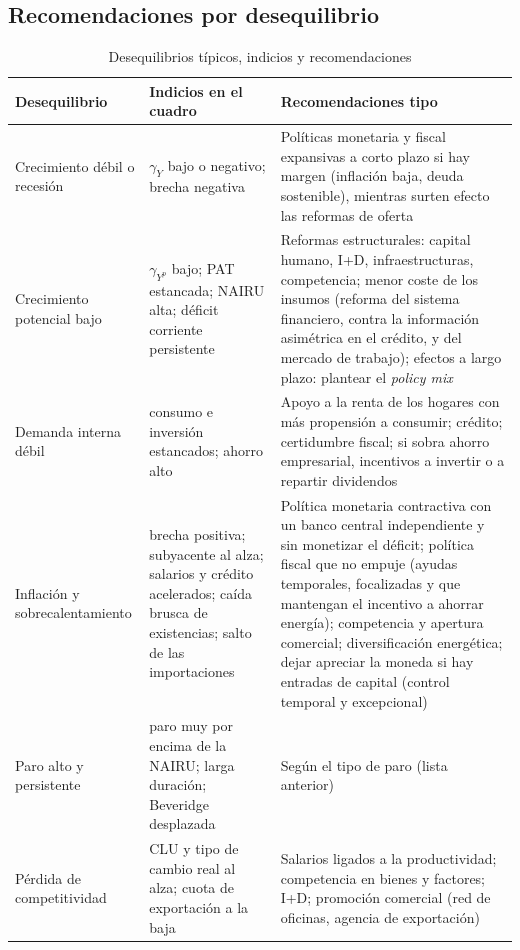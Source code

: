 \documentclass[11pt]{article}
\begin{document}
\subsection{Recomendaciones por desequilibrio}\label{sec:por-desequilibrio}

\begin{table}[!t]
\centering\footnotesize\renewcommand{\arraystretch}{0.9}
\caption{Desequilibrios típicos, indicios y recomendaciones}\label{tab:recomendaciones}
\begin{tabular}{>{\raggedright\arraybackslash}p{2.7cm}>{\raggedright\arraybackslash}p{3.8cm}>{\raggedright\arraybackslash}p{7.8cm}}
\toprule
\rowcolor{tceeazulpalido}
\textbf{Desequilibrio} & \textbf{Indicios en el cuadro} & \textbf{Recomendaciones tipo} \\
\midrule
Crecimiento débil o recesión & $\gamma_Y$ bajo o negativo; brecha negativa & Políticas monetaria y fiscal expansivas a corto plazo si hay margen (inflación baja, deuda sostenible), mientras surten efecto las reformas de oferta \\
Crecimiento potencial bajo & $\gamma_{Y^p}$ bajo; PAT estancada; NAIRU alta; déficit corriente persistente & Reformas estructurales: capital humano, I+D, infraestructuras, competencia; menor coste de los insumos (reforma del sistema financiero, contra la información asimétrica en el crédito, y del mercado de trabajo); efectos a largo plazo: plantear el \emph{policy mix} \\
Demanda interna débil & consumo e inversión estancados; ahorro alto & Apoyo a la renta de los hogares con más propensión a consumir; crédito; certidumbre fiscal; si sobra ahorro empresarial, incentivos a invertir o a repartir dividendos \\
Inflación y sobrecalentamiento & brecha positiva; subyacente al alza; salarios y crédito acelerados; caída brusca de existencias; salto de las importaciones & Política monetaria contractiva con un banco central independiente y sin monetizar el déficit; política fiscal que no empuje (ayudas temporales, focalizadas y que mantengan el incentivo a ahorrar energía); competencia y apertura comercial; diversificación energética; dejar apreciar la moneda si hay entradas de capital (control temporal y excepcional) \\
Paro alto y persistente & paro muy por encima de la NAIRU; larga duración; Beveridge desplazada & Según el tipo de paro (lista anterior) \\
Pérdida de competitividad & CLU y tipo de cambio real al alza; cuota de exportación a la baja & Salarios ligados a la productividad; competencia en bienes y factores; I+D; promoción comercial (red de oficinas, agencia de exportación) \\

\end{tabular}
\end{table}
\end{document}
